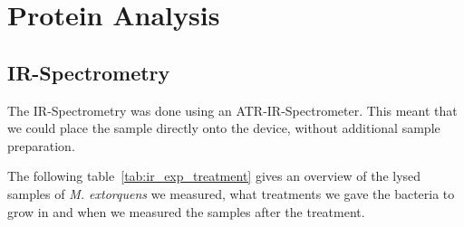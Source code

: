\section{Protein Analysis\authorA}

\subsection{IR-Spectrometry}

The IR-Spectrometry was done using an ATR-IR-Spectrometer.
This meant that we could place the sample directly onto the device, without additional sample preparation.

The following table~\ref{tab:ir_exp_treatment} gives an overview of the lysed samples of \emph{M. extorquens} we measured, what treatments we gave the bacteria to grow in and when we measured the samples after the treatment.

